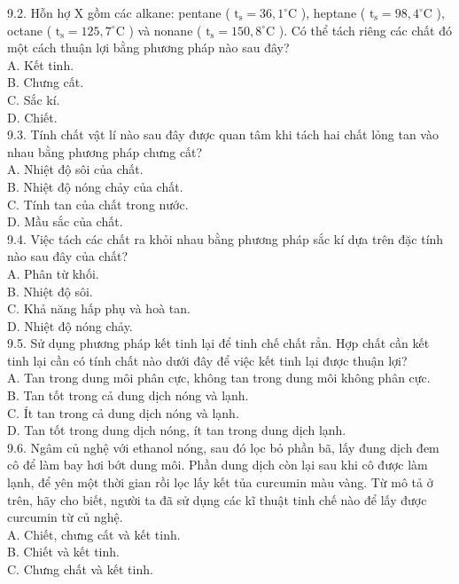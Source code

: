 \documentclass[10pt]{article}
\begin{document}
9.2. Hỗn hợ X gồm các alkane: pentane ( $\mathrm{t}_{\mathrm{s}}=36,1^{\circ} \mathrm{C}$ ), heptane ( $\mathrm{t}_{\mathrm{s}}=98,4^{\circ} \mathrm{C}$ ), octane ( $\mathrm{t}_{\mathrm{s}}=125,7^{\circ} \mathrm{C}$ ) và nonane ( $\mathrm{t}_{\mathrm{s}}=150,8^{\circ} \mathrm{C}$ ). Có thể tách riêng các chất đó một cách thuận lợi bằng phương pháp nào sau đây?\\
A. Kết tinh.\\
B. Chưng cất.\\
C. Sắc kí.\\
D. Chiết.\\
9.3. Tính chất vật lí nào sau đây được quan tâm khi tách hai chất lỏng tan vào nhau bằng phương pháp chưng cất?\\
A. Nhiệt độ sôi của chất.\\
B. Nhiệt độ nóng chảy của chất.\\
C. Tính tan của chất trong nước.\\
D. Mầu sắc của chất.\\
9.4. Việc tách các chất ra khỏi nhau bằng phương pháp sắc kí dựa trên đặc tính nào sau đây của chất?\\
A. Phân từ khối.\\
B. Nhiệt độ sôi.\\
C. Khả năng hấp phụ và hoà tan.\\
D. Nhiệt độ nóng chảy.\\
9.5. Sử dụng phương pháp kết tinh lại để tinh chế chất rẳn. Hợp chất cần kết tinh lại cần có tính chất nào dưới đây để việc kết tinh lại được thuận lợi?\\
A. Tan trong dung môi phân cực, không tan trong dung môi không phân cực.\\
B. Tan tốt trong cả dung dịch nóng và lạnh.\\
C. Ít tan trong cả dung dịch nóng và lạnh.\\
D. Tan tốt trong dung dịch nóng, ít tan trong dung dịch lạnh.\\
9.6. Ngâm củ nghệ với ethanol nóng, sau đó lọc bỏ phần bã, lấy đung dịch đem cô để làm bay hơi bớt dung môi. Phần dung dịch còn lại sau khi cô được làm lạnh, để yên một thời gian rồi lọc lấy kết tủa curcumin màu vàng. Từ mô tả ở trên, hãy cho biết, người ta đã sử dụng các kĩ thuật tinh chế nào để lấy được curcumin từ củ nghệ.\\
A. Chiết, chưng cất và kết tinh.\\
B. Chiết và kết tinh.\\
C. Chưng chất và kết tinh.\\
\end{document}
